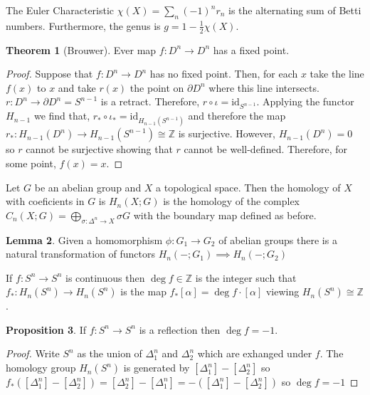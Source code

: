\documentclass[12pt]{extarticle}
\newcommand{\Z}{\mathbb{Z}}
\newcommand{\id}{\mathrm{id}}
\theoremstyle{definition}
\newtheorem{theorem}{Theorem}[section]
\newtheorem{lemma}[theorem]{Lemma}
\newtheorem{proposition}[theorem]{Proposition}
\newenvironment{definition}[1][Definition:]{\begin{trivlist}
\item[\hskip \labelsep {\bfseries #1}]}{\end{trivlist}}
\begin{document}
\begin{definition}
The Euler Characteristic $\chi(X) = \sum_{n} (-1)^n r_n$ is the alternating sum of Betti numbers. Furthermore, the genus is $g = 1 - \tfrac{1}{2} \chi(X)$.
\end{definition}

\begin{theorem}[Brouwer]
Ever map $f : D^n \to D^n$ has a fixed point.
\end{theorem}

\begin{proof}
Suppose that $f : D^n \to D^n$ has no fixed point. Then, for each $x$ take the line $f(x)$ to $x$ and take $r(x)$ the point on $\partial D^n$ where this line intersects. $r : D^n \to \partial D^n = S^{n-1}$ is a retract. Therefore, $r \circ \iota = \id_{S^{n-1}}$. Applying the functor $H_{n-1}$ we find that, $r_* \circ \iota_* = \id_{H_{n-1}(S^{n-1})}$ and therefore the map $r_* : H_{n-1}(D^n) \to H_{n-1}(S^{n-1}) \cong \Z$ is surjective. However, $H_{n-1}(D^n) = 0$ so $r$ cannot be surjective showing that $r$ cannot be well-defined. Therefore, for some point, $f(x) = x$. 
\end{proof}

\begin{definition}
Let $G$ be an abelian group and $X$ a topological space. Then the homology of $X$ with coeficients in $G$ is $H_n(X; G)$ is the homology of the complex $C_n(X; G) = \bigoplus\limits_{\sigma : \Delta^n \to X} \sigma G$ with the boundary map defined as before. 
\end{definition}

\begin{lemma}
Given a homomorphism $\phi : G_1 \to G_2$ of abelian groups there is a natural transformation of functors $H_n( - ; G_1) \implies H_n(- ; G_2)$
\end{lemma}

\begin{definition}
If $f : S^n \to S^n$ is continuous then $\deg{f} \in \Z$ is the integer such that $f_* : H_n(S^n) \to H_n(S^n)$ is the map $f_* [\alpha] = \deg{f} \cdot [\alpha]$ viewing $H_n(S^n) \cong \Z$. 
\end{definition}

\begin{proposition}
If $f : S^n \to S^n$ is a reflection then $\deg{f} = -1$. 
\end{proposition}

\begin{proof}
Write $S^n$ as the union of $\Delta^n_1$ and $\Delta^n_2$ which are exhanged under $f$. The homology group $H_n(S^n)$ is generated by $[\Delta_1^n] - [\Delta_2^n]$ so $f_*([\Delta_1^n] - [\Delta_2^n]) = [\Delta_2^n] - [\Delta_1^n] = - ([\Delta_1^n] - [\Delta_2^n]) $
so $\deg{f} = -1$ 
\end{proof}
\end{document}
